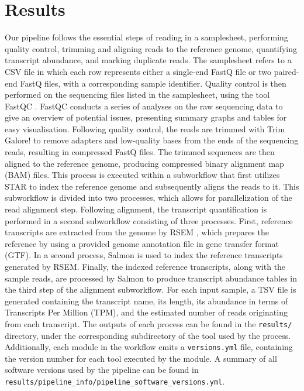 \documentclass[12pt]{article}
\begin{document}
\section{Results}
Our pipeline follows the essential steps of reading in a samplesheet, performing quality control, trimming and aligning reads to the reference genome, quantifying transcript abundance, and marking duplicate reads.
The samplesheet refers to a CSV file in which each row represents either a single-end FastQ file or two paired-end FastQ files, with a corresponding sample identifier.
Quality control is then performed on the sequencing files listed in the samplesheet, using the tool FastQC \cite{fastqc}. FastQC conducts a series of analyses on the raw sequencing data to give an overview of potential issues, presenting summary graphs and tables for easy visualisation.
Following quality control, the reads are trimmed with Trim Galore! \cite{trimgalore} to remove adapters and low-quality bases from the ends of the sequencing reads, resulting in compressed FastQ files.
The trimmed sequences are then aligned to the reference genome, producing compressed binary alignment map (BAM) files. This process is executed within a subworkflow that first utilizes STAR \cite{Dobin2012} to index the reference genome and subsequently aligns the reads to it. This subworkflow is divided into two processes, which allows for parallelization of the read alignment step.
Following alignment, the transcript quantification is performed in a second subworkflow consisting of three processes. First, reference transcripts are extracted from the genome by RSEM \cite{Li2011}, which prepares the reference by using a provided genome annotation file in gene transfer format (GTF).
In a second process, Salmon \cite{Patro2017} is used to index the reference transcripts generated by RSEM. Finally, the indexed reference transcripts, along with the sample reads, are processed by Salmon to produce transcript abundance tables in the third step of the alignment subworkflow. For each input sample, a TSV file is generated containing the transcript name, its length, its abundance in terms of Transcripts Per Million (TPM), and the estimated number of reads originating from each transcript.
The outputs of each process can be found in the \verb|results/| directory, under the corresponding subdirectory of the tool used by the process.
Additionally, each module in the workflow emits a \verb|versions.yml| file, containing the version number for each tool executed by the module. A summary of all software versions used by the pipeline can be found in \verb|results/pipeline_info/pipeline_software_versions.yml|.
\end{document}
